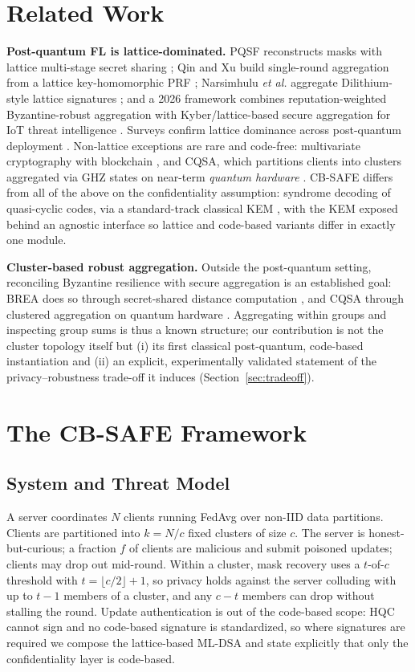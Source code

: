 \documentclass[conference]{IEEEtran}
\begin{document}
\section{Related Work}
\textbf{Post-quantum FL is lattice-dominated.} PQSF reconstructs masks with lattice
multi-stage secret sharing \cite{pqsf2024}; Qin and Xu build single-round aggregation
from a lattice key-homomorphic PRF \cite{qinxu2025}; Narsimhulu \emph{et al.}
aggregate Dilithium-style lattice signatures \cite{narsimhulu2026}; and a 2026
framework combines reputation-weighted Byzantine-robust aggregation with
Kyber/lattice-based secure aggregation for IoT threat intelligence
\cite{byzpqfl2026}. Surveys confirm lattice dominance across post-quantum deployment
\cite{nguyen2025lattice}. Non-lattice exceptions are rare and code-free: multivariate
cryptography with blockchain \cite{singh2025pqfog}, and CQSA, which partitions
clients into clusters aggregated via GHZ states on near-term \emph{quantum hardware}
\cite{cqsa2026}. CB-SAFE differs from all of the above on the confidentiality
assumption: syndrome decoding of quasi-cyclic codes, via a standard-track classical
KEM \cite{nistir8545}, with the KEM exposed behind an agnostic interface so lattice
and code-based variants differ in exactly one module.

\textbf{Cluster-based robust aggregation.} Outside the post-quantum setting,
reconciling Byzantine resilience with secure aggregation is an established goal:
BREA does so through secret-shared distance computation \cite{brea2021}, and CQSA
through clustered aggregation on quantum hardware \cite{cqsa2026}. Aggregating
within groups and inspecting group sums is thus a known structure; our contribution is not the cluster topology itself but (i) its
first classical post-quantum, code-based instantiation and (ii) an explicit,
experimentally validated statement of the privacy--robustness trade-off it induces
(Section~\ref{sec:tradeoff}).

\section{The CB-SAFE Framework}
\subsection{System and Threat Model}
A server coordinates $N$ clients running FedAvg over non-IID data partitions.
Clients are partitioned into $k=N/c$ fixed clusters of size $c$. The server is
honest-but-curious; a fraction $f$ of clients are malicious and submit poisoned
updates; clients may drop out mid-round. Within a cluster, mask recovery uses a
$t$-of-$c$ threshold with $t=\lfloor c/2\rfloor+1$, so privacy holds against the
server colluding with up to $t-1$ members of a cluster, and any $c-t$ members can
drop without stalling the round. Update authentication is out of the code-based
scope: HQC cannot sign and no code-based signature is standardized, so where
signatures are required we compose the lattice-based ML-DSA and state explicitly
that only the confidentiality layer is code-based.
\end{document}
